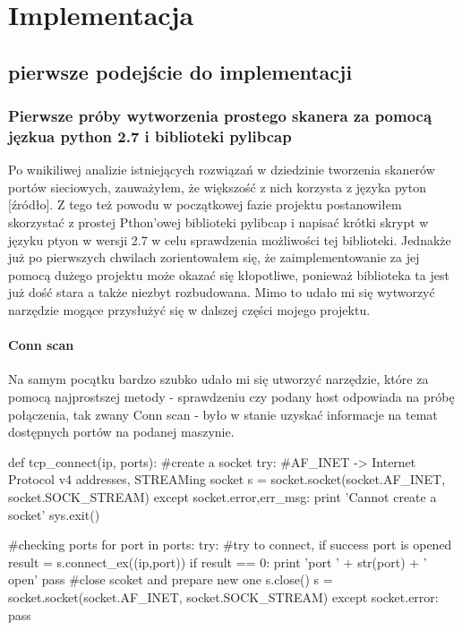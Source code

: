 \chapter{Implementacja}


\section{pierwsze podejście do implementacji}

\subsection{Pierwsze próby wytworzenia prostego skanera za pomocą jęzkua python 2.7 i biblioteki pylibcap}

Po wnikiliwej analizie istniejących rozwiązań w dziedzinie tworzenia skanerów portów sieciowych, zauważyłem, że większość z nich korzysta z języka pyton [źródło]. Z tego też powodu w początkowej fazie projektu postanowiłem skorzystać z prostej Pthon'owej biblioteki pylibcap i napisać krótki skrypt w języku ptyon w wersji 2.7 w celu sprawdzenia możliwości tej biblioteki. Jednakże już po pierwszych chwilach zorientowałem się, że zaimplementowanie za jej pomocą dużego projektu może okazać się kłopotliwe, ponieważ biblioteka ta jest już dość stara a także niezbyt rozbudowana. Mimo to udało mi się wytworzyć narzędzie mogące przysłużyć się w dalszej części mojego projektu.

\subsubsection{Conn scan}
Na samym pocątku bardzo szubko udało mi się utworzyć narzędzie, które za pomocą najprostszej metody - sprawdzeniu czy podany host odpowiada na próbę połączenia, tak zwany Conn scan - było w stanie uzyskać informacje na temat dostępnych portów na podanej maszynie. 


\begin{python}
def tcp_connect(ip, ports):
    #create a socket
    try:
        #AF_INET -> Internet Protocol v4 addresses, STREAMing socket
        s = socket.socket(socket.AF_INET, socket.SOCK_STREAM)
    except socket.error,err_msg:
      print 'Cannot create a socket'
      sys.exit()

    #checking ports
    for port in ports:
        try:
            #try to connect, if success port is opened
            result = s.connect_ex((ip,port))
            if result == 0:
                print 'port ' + str(port) + ' open'
                pass
            #close scoket and prepare new one
            s.close()
            s = socket.socket(socket.AF_INET, socket.SOCK_STREAM)
        except socket.error:
            pass
\end{python}

